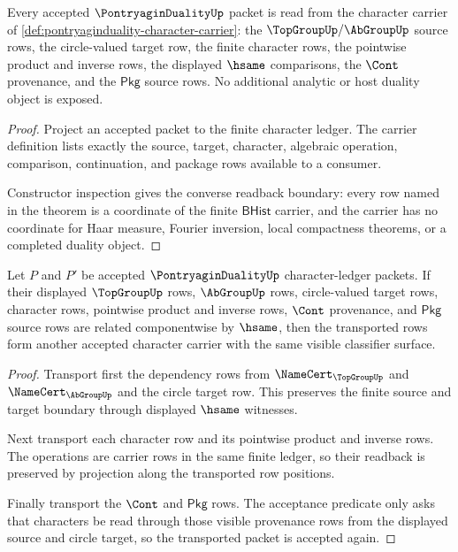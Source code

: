 \begin{theorem}
\label{thm:pontryaginduality-character-carrier-obligation}
Every accepted $\PontryaginDualityUp$ packet is read from the character carrier
of \autoref{def:pontryaginduality-character-carrier}: the
$\TopGroupUp/\AbGroupUp$ source rows, the circle-valued target row, the finite
character rows, the pointwise product and inverse rows, the displayed
$\hsame$ comparisons, the $\Cont$ provenance, and the $\mathsf{Pkg}$ source
rows. No additional analytic or host duality object is exposed.
\end{theorem}
\begin{proof}
Project an accepted packet to the finite character ledger. The carrier
definition lists exactly the source, target, character, algebraic operation,
comparison, continuation, and package rows available to a consumer.

Constructor inspection gives the converse readback boundary: every row named
in the theorem is a coordinate of the finite $\mathsf{BHist}$ carrier, and the
carrier has no coordinate for Haar measure, Fourier inversion, local
compactness theorems, or a completed duality object.
\end{proof}

\begin{theorem}
\label{thm:pontryaginduality-character-classifier-stability}
Let $P$ and $P'$ be accepted $\PontryaginDualityUp$ character-ledger packets.
If their displayed $\TopGroupUp$ rows, $\AbGroupUp$ rows, circle-valued target
rows, character rows, pointwise product and inverse rows, $\Cont$ provenance,
and $\mathsf{Pkg}$ source rows are related componentwise by $\hsame$, then the
transported rows form another accepted character carrier with the same visible
classifier surface.
\end{theorem}
\begin{proof}
Transport first the dependency rows from $\NameCert_{\TopGroupUp}$ and
$\NameCert_{\AbGroupUp}$ and the circle target row. This preserves the finite
source and target boundary through displayed $\hsame$ witnesses.

Next transport each character row and its pointwise product and inverse rows.
The operations are carrier rows in the same finite ledger, so their readback is
preserved by projection along the transported row positions.

Finally transport the $\Cont$ and $\mathsf{Pkg}$ rows. The acceptance
predicate only asks that characters be read through those visible provenance
rows from the displayed source and circle target, so the transported packet is
accepted again.
\end{proof}

